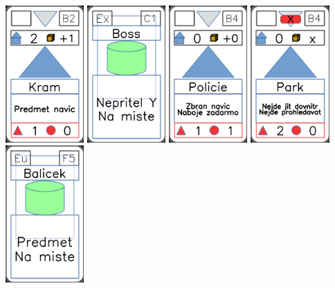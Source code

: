 \documentclass[a4paper]{article}
\begin{document}
	\includegraphics[width=3.0cm]{img-3_6}
	\includegraphics[width=3.0cm]{img-4_10}
	\includegraphics[width=3.0cm]{img-3_8}
	\includegraphics[width=3.0cm]{img-3_23}
	\includegraphics[width=3.0cm]{img-4_29}
\end{document}

